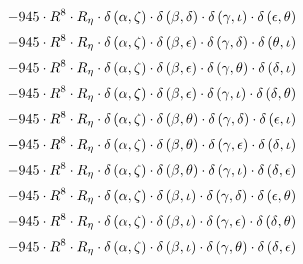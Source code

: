 \begin{subequations}
\begin{gather}
 \\[0.2em] \notag 		 - 945 \cdot R^{8} \cdot R_{\eta{}} \cdot \delta{}\left(\alpha{}, \zeta{}\right) \cdot \delta{}\left(\beta{}, \delta{}\right) \cdot \delta{}\left(\gamma{}, \iota{}\right) \cdot \delta{}\left(\epsilon{}, \theta{}\right) 
 \\[0.2em] \notag 		 - 945 \cdot R^{8} \cdot R_{\eta{}} \cdot \delta{}\left(\alpha{}, \zeta{}\right) \cdot \delta{}\left(\beta{}, \epsilon{}\right) \cdot \delta{}\left(\gamma{}, \delta{}\right) \cdot \delta{}\left(\theta{}, \iota{}\right) 
 \\[0.2em] \notag 		 - 945 \cdot R^{8} \cdot R_{\eta{}} \cdot \delta{}\left(\alpha{}, \zeta{}\right) \cdot \delta{}\left(\beta{}, \epsilon{}\right) \cdot \delta{}\left(\gamma{}, \theta{}\right) \cdot \delta{}\left(\delta{}, \iota{}\right) 
 \\[0.2em] \notag 		 - 945 \cdot R^{8} \cdot R_{\eta{}} \cdot \delta{}\left(\alpha{}, \zeta{}\right) \cdot \delta{}\left(\beta{}, \epsilon{}\right) \cdot \delta{}\left(\gamma{}, \iota{}\right) \cdot \delta{}\left(\delta{}, \theta{}\right) 
 \\[0.2em] \notag 		 - 945 \cdot R^{8} \cdot R_{\eta{}} \cdot \delta{}\left(\alpha{}, \zeta{}\right) \cdot \delta{}\left(\beta{}, \theta{}\right) \cdot \delta{}\left(\gamma{}, \delta{}\right) \cdot \delta{}\left(\epsilon{}, \iota{}\right) 
 \\[0.2em] \notag 		 - 945 \cdot R^{8} \cdot R_{\eta{}} \cdot \delta{}\left(\alpha{}, \zeta{}\right) \cdot \delta{}\left(\beta{}, \theta{}\right) \cdot \delta{}\left(\gamma{}, \epsilon{}\right) \cdot \delta{}\left(\delta{}, \iota{}\right) 
 \\[0.2em] \notag 		 - 945 \cdot R^{8} \cdot R_{\eta{}} \cdot \delta{}\left(\alpha{}, \zeta{}\right) \cdot \delta{}\left(\beta{}, \theta{}\right) \cdot \delta{}\left(\gamma{}, \iota{}\right) \cdot \delta{}\left(\delta{}, \epsilon{}\right) 
 \\[0.2em] \notag 		 - 945 \cdot R^{8} \cdot R_{\eta{}} \cdot \delta{}\left(\alpha{}, \zeta{}\right) \cdot \delta{}\left(\beta{}, \iota{}\right) \cdot \delta{}\left(\gamma{}, \delta{}\right) \cdot \delta{}\left(\epsilon{}, \theta{}\right) 
 \\[0.2em] \notag 		 - 945 \cdot R^{8} \cdot R_{\eta{}} \cdot \delta{}\left(\alpha{}, \zeta{}\right) \cdot \delta{}\left(\beta{}, \iota{}\right) \cdot \delta{}\left(\gamma{}, \epsilon{}\right) \cdot \delta{}\left(\delta{}, \theta{}\right) 
 \\[0.2em] \notag 		 - 945 \cdot R^{8} \cdot R_{\eta{}} \cdot \delta{}\left(\alpha{}, \zeta{}\right) \cdot \delta{}\left(\beta{}, \iota{}\right) \cdot \delta{}\left(\gamma{}, \theta{}\right) \cdot \delta{}\left(\delta{}, \epsilon{}\right) 

\end{gather}
\end{subequations}
